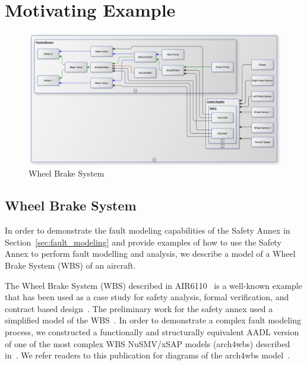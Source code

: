  \section{Motivating Example}
\label{sec:case_study} 

\begin{figure}[h!]
	\centering
	\includegraphics[trim=0 9 0 5,clip,width=\textwidth]{images/wbs_arch.pdf}
	\caption{Wheel Brake System}
	\label{fig:wbs}
\end{figure} 

\subsection{Wheel Brake System}
In order to demonstrate the fault modeling capabilities of the Safety Annex in Section~\ref{sec:fault_modeling} and provide examples of how to use the Safety Annex to perform fault modelling and analysis, we describe a model of a Wheel Brake System (WBS) of an aircraft. 

The Wheel Brake System (WBS) described in AIR6110~\cite{AIR6110} is a well-known example that has been used as a case study for safety analysis, formal verification, and contract based design~\cite{DBLP:conf/cav/BozzanoCPJKPRT15, 10.1007/978-3-319-11936-6-7, CAV2015:BoCiGrMa, Joshi05:SafeComp}. The preliminary work for the safety annex used a simplified model of the WBS~\cite{Stewart17:IMBSA}. In order to demonstrate a complex fault modeling process, we constructed a functionally and structurally equivalent AADL version of one of the most complex WBS NuSMV/xSAP models (arch4wbs) described in~\cite{DBLP:conf/cav/BozzanoCPJKPRT15}. We refer readers to this publication for diagrams of the arch4wbs model~\cite{DBLP:conf/cav/BozzanoCPJKPRT15}.   

